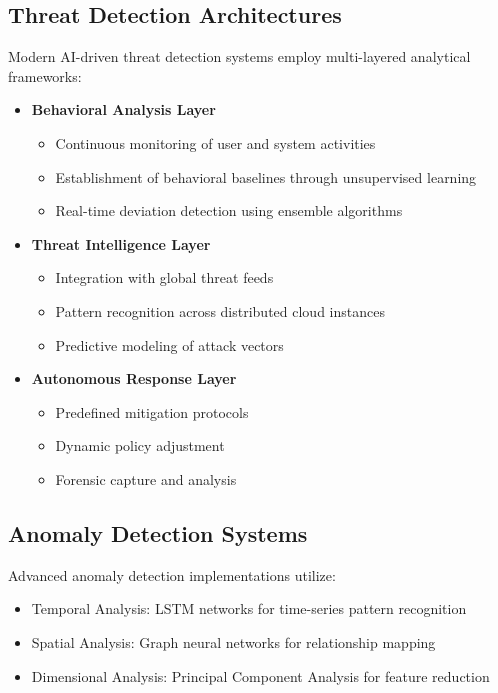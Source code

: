 \documentclass[a4paper,12pt]{article}
\begin{document}
\subsection{Threat Detection Architectures}
Modern AI-driven threat detection systems employ multi-layered analytical frameworks:
\begin{itemize}
    \item \textbf{Behavioral Analysis Layer}
          \begin{itemize}
              \item Continuous monitoring of user and system activities
              \item Establishment of behavioral baselines through unsupervised learning
              \item Real-time deviation detection using ensemble algorithms
          \end{itemize}
    \item \textbf{Threat Intelligence Layer}
          \begin{itemize}
              \item Integration with global threat feeds
              \item Pattern recognition across distributed cloud instances
              \item Predictive modeling of attack vectors
          \end{itemize}
    \item \textbf{Autonomous Response Layer}
          \begin{itemize}
              \item Predefined mitigation protocols
              \item Dynamic policy adjustment
              \item Forensic capture and analysis
          \end{itemize}
\end{itemize}

\subsection{Anomaly Detection Systems}
Advanced anomaly detection implementations utilize:
\begin{itemize}
    \item Temporal Analysis: LSTM networks for time-series pattern recognition
    \item Spatial Analysis: Graph neural networks for relationship mapping
    \item Dimensional Analysis: Principal Component Analysis for feature reduction
\end{itemize}
\end{document}
